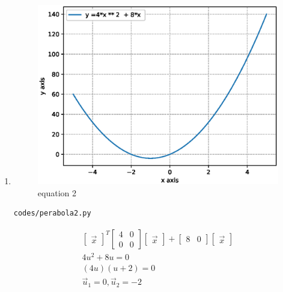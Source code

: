 \begin{enumerate}[label=\arabic*.,ref=\thesubsection.\theenumi]
\item
\begin{figure}[!ht]
	\centering
	\includegraphics[width=\columnwidth]{./figures/perabola2.eps}
	\caption{equation 2 }
	\label{fig:perabola2}
\end{figure}
\begin{lstlisting}
codes/perabola2.py
\end{lstlisting} 
\begin{align}
\begin{bmatrix}\vec x\end{bmatrix}^T\begin{bmatrix}4 & 0\\0 & 0\end{bmatrix}\begin{bmatrix}\vec x\end{bmatrix} + \begin{bmatrix}8 & 0\end{bmatrix}\begin{bmatrix}\vec x\end{bmatrix} 
\\
4u^2 + 8u = 0
\\
\left(4u\right)\left(u+2\right) = 0
\\
\vec u_1 = 0 ,\vec u_2 =-2 
\end{align}




\end{enumerate}
